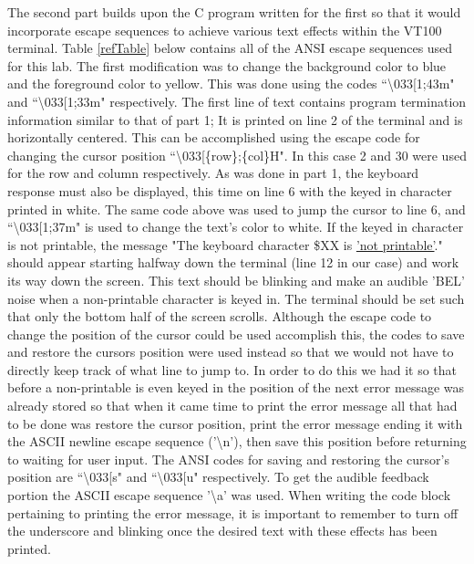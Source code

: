 \documentclass[12pt]{article}
\begin{document}
The second part builds upon the C program written for the first so that it would incorporate escape sequences to achieve various text effects within the VT100 terminal. Table \ref{refTable} below contains all of the ANSI escape sequences used for this lab. The first modification was to change the background color to blue and the foreground color to yellow. This was done using the codes ``\textbackslash033[1;43m" and ``\textbackslash033[1;33m" respectively. The first line of text contains program termination information similar to that of part 1; It is printed on line 2 of the terminal and is horizontally centered. This can be accomplished using the escape code for changing the cursor position ``\textbackslash033[\{row\};\{col\}H". In this case 2 and 30 were used for the row and column respectively.
As was done in part 1, the keyboard response must also be displayed, this time on line 6 with the keyed in character printed in white. The same code above was used to jump the cursor to line 6, and ``\textbackslash033[1;37m" is used to change the text's color to white. If the keyed in character is not printable, the message "The keyboard character \$XX is \underline{'not printable'}." should appear starting halfway down the terminal (line 12 in our case) and work its way down the screen. This text should be blinking and make an audible 'BEL' noise when a non-printable character is keyed in. The terminal should be set such that only the bottom half of the screen scrolls. Although the escape code to change the position of the cursor could be used accomplish this, the codes to save and restore the cursors position were used instead so that we would not have to directly keep track of what line to jump to. In order to do this we had it so that before a non-printable is even keyed in the position of the next error message was already stored so that when it came time to print the error message all that had to be done was restore the cursor position, print the error message ending it with the ASCII newline escape sequence ('\textbackslash n'), then save this position before returning to waiting for user input. The ANSI codes for saving and restoring the cursor's position are ``\textbackslash033[s" and ``\textbackslash033[u" respectively. To get the audible feedback portion the ASCII escape sequence '\textbackslash a' was used. When writing the code block pertaining to printing the error message, it is important to remember to turn off the underscore and blinking once the desired text with these effects has been printed.
\end{document}
